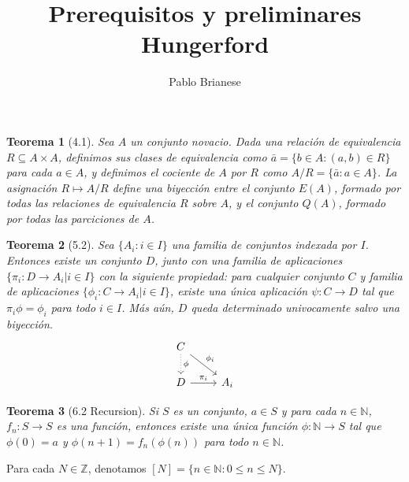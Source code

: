 \documentclass{report}
\title{Prerequisitos y preliminares \\ Hungerford}
\author{Pablo Brianese}
\newcommand{\naturalNumbers}{\mathbb{N}}
\newcommand{\integerNumbers}{\mathbb{Z}}
\newtheorem{theorem}{Teorema}
\begin{document}
  \maketitle

  \begin{theorem}[4.1]
    Sea \(A\) un conjunto novacio.
    Dada una relación de equivalencia \(R \subseteq A \times A\), definimos sus clases de equivalencia como \(\bar{a} = \{b \in A : (a, b) \in R\}\) para cada \(a \in A\), y definimos el cociente de \(A\) por \(R\) como \(A / R = \{\bar{a} : a \in A\}\).
    La asignación \(R \mapsto A / R\) define una biyección entre el conjunto \(E(A)\), formado por todas las relaciones de equivalencia \(R\) sobre \(A\), y el conjunto \(Q(A)\), formado por todas las parciciones de \(A\).
  \end{theorem}

  \begin{theorem}[5.2]
    Sea \(\{A_i : i \in I\}\) una familia de conjuntos indexada por \(I\).
    Entonces existe un conjunto \(D\), junto con una familia de aplicaciones \(\{\pi_i : D \rightarrow A_i | i \in I\}\) con la siguiente propiedad:
    para cualquier conjunto \(C\) y familia de aplicaciones \(\{\phi_i : C \rightarrow A_i | i \in I\}\), existe una única aplicación \(\psi : C \rightarrow D\) tal que \(\pi_i \phi = \phi_i\) para todo \(i \in I\).
    Más aún, \(D\) queda determinado univocamente salvo una biyección.
    \[
      \begin{tikzcd}
        C \arrow{rd}{\phi_i} \arrow[dotted]{d}{\phi} \\
        D \arrow{r}{\pi_i} & A_i
      \end{tikzcd}
    \]
  \end{theorem}

  \begin{theorem}[6.2 Recursion]
    Si \(S\) es un conjunto, \(a \in S\) y para cada \(n \in \naturalNumbers\), \(f_n : S \rightarrow S\) es una función, entonces existe una única función \(\phi : \naturalNumbers \rightarrow S\) tal que \(\phi(0) = a\) y \(\phi(n + 1) = f_n(\phi(n))\) para todo \( n \in \naturalNumbers\).
  \end{theorem}

  Para cada \(N \in \integerNumbers\), denotamos \([N] = \{n \in \naturalNumbers : 0 \leq n \leq N\}\).
\end{document}
